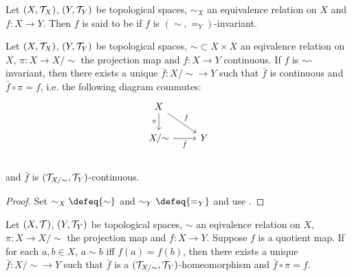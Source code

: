 \documentclass{book}
\begin{document}
	\begin{defn}  
		Let $(X, \mathcal{T}_X)$, $(Y, \mathcal{T}_Y)$ be topological spaces, $\sim_X$ an equivalence relation on $X$ and $f : X \rightarrow Y $. Then $f$ is said to be  if $f$ is $({\sim}, {=_Y})$-invariant.
	\end{defn}

	\begin{ex} 
		Let $(X, \mathcal{T}_X)$, $(Y, \mathcal{T}_Y)$ be topological spaces, ${\sim} \subset X \times X$ an eqivalence relation on $X$, $\pi:X \rightarrow X/ {\sim}$ the projection map and $f:X \rightarrow Y$ continuous. If $f$ is ${\sim}$-invariant, then there exists a unique $\bar{f}:X / {\sim} \rightarrow Y$ such that $\bar{f}$ is continuous and $\bar{f} \circ \pi = f$, i.e. the following diagram commutes:
		\[ 
		\begin{tikzcd}
			X  \arrow[dr, "f"]  \arrow[d, "\pi"']  & \\
			X/ {\sim} \arrow[r, "\bar{f}"'] &  Y  \\
		\end{tikzcd}
		\]
		and $\bar{f}$ is $(\mathcal{T}_{X/ \sim}, \mathcal{T}_Y)$-continuous.
	\end{ex}

	\begin{proof}
		Set $\sim_X \defeq {\sim}$ and $\sim_Y \defeq {=_Y}$ and use .
	\end{proof}

	\begin{ex} 
		Let $(X, \mathcal{T})$, $(Y, \mathcal{T}_Y)$ be topological spaces, $\sim$ an eqivalence relation on $X$, $\pi:X \rightarrow X/\sim$ the projection map and $f:X \rightarrow Y$. Suppose $f$ is a quotient map. If for each $a, b \in X$, $a \sim b$ iff $f(a) = f(b)$, then there exists a unique $\bar{f}: X/{\sim} \rightarrow Y$ such that $\bar{f}$ is a  $(\mathcal{T}_{X/{\sim}}, \mathcal{T}_Y)$-homeomorphism and $\bar{f} \circ \pi = f$.
	\end{ex}
	
\end{document}
